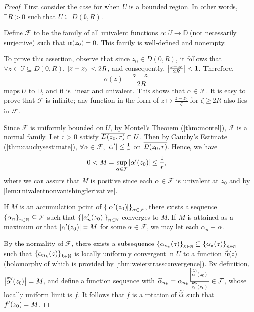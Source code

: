 \begin{proof}
    First consider the case for when \(U\) is a bounded region. In other words, \(\exists R>0\) such that \(U\subseteq D(0,R)\).

    Define \(\mathcal{F}\) to be the family of all univalent functions \(\alpha:U\to\mathbb{D}\) (not necessarily surjective) such that \(\alpha\qty(z_0)=0\). This family is well-defined and nonempty.

    To prove this assertion, observe that since \(z_0\in D(0,R)\), it follows that \(\forall z\in U\subseteq D(0,R)\), \(\abs{z-z_0}<2R\), and consequently, \(\abs{\frac{z-z_0}{2R}}<1\). Therefore, \[\alpha(z)=\frac{z-z_0}{2R}\] maps \(U\) to \(\mathbb{D}\), and it is linear and univalent. This shows that \(\alpha\in\mathcal{F}\). It is easy to prove that \(\mathcal{F}\) is infinite; any function in the form of \(z\mapsto\frac{z-z_0}{\zeta}\) for \(\zeta\geq2R\) also lies in \(\mathcal{F}\).

    Since \(\mathcal{F}\) is uniformly bounded on \(U\), by Montel's Theorem (\cref{thm:montel}), \(\mathcal{F}\) is a normal family. Let \(r>0\) satisfy \(\overline{D\qty(z_0,r)}\subset U\). Then by Cauchy's Estimate (\cref{thm:cauchysestimate}), \(\forall \alpha\in\mathcal{F}\), \(\abs{\alpha'}\leq\frac{1}{r}\) on \(\overline{D\qty(z_0,r)}\). Hence, we have
    \begin{equation}
        0<M=\sup_{\alpha\in\mathcal{F}}\abs{\alpha'\qty(z_0)}\leq\frac{1}{r},\label{eq:riemannmapping_fixedpointderivativesupremum}
    \end{equation}
    where we can assure that \(M\) is positive since each \(\alpha\in\mathcal{F}\) is univalent at \(z_0\) and by \cref{lem:univalentnonvanishingderivative}.

    If \(M\) is an accumulation point of \(\cbraces{\abs{\alpha'\qty(z_0)}}_{\alpha\in\mathcal{F}}\), there exists a sequence \(\cbraces{\alpha_n}_{n\in\mathbb{N}}\subseteq\mathcal{F}\) such that \(\cbraces{\abs{\alpha'_n\qty(z_0)}}_{n\in\mathbb{N}}\) converges to \(M\). If \(M\) is attained as a maximum or that \(\abs{\alpha'(z_0)}=M\) for some \(\alpha\in\mathcal{F}\), we may let each \(\alpha_n\equiv\alpha\).

    By the normality of \(\mathcal{F}\), there exists a subsequence \(\cbraces{\alpha_{n_k}(z)}_{k\in\mathbb{N}}\subseteq\cbraces{\alpha_n(z)}_{n\in\mathbb{N}}\) such that \(\cbraces{\alpha_{n_k}(z)}_{k\in\mathbb{N}}\) is locally uniformly convergent in \(U\) to a function \(\doubletilde{\alpha}(z)\) (holomorphy of which is provided by \cref{thm:weierstrassconvergence}). By definition, \(\abs{\doubletilde{\alpha}'\qty(z_0)}=M\), and define a function sequence with \(\widetilde{\alpha}_{n_k}=\alpha_{n_k}\frac{\abs{\doubletilde{\alpha}'\qty(z_0)}}{\doubletilde{\alpha}'\qty(z_0)}\in\mathcal{F}\), whose locally uniform limit is \(f\). It follows that \(f\) is a rotation of \(\doubletilde{\alpha}\) such that \(f'\qty(z_0)=M\).


\end{proof}
